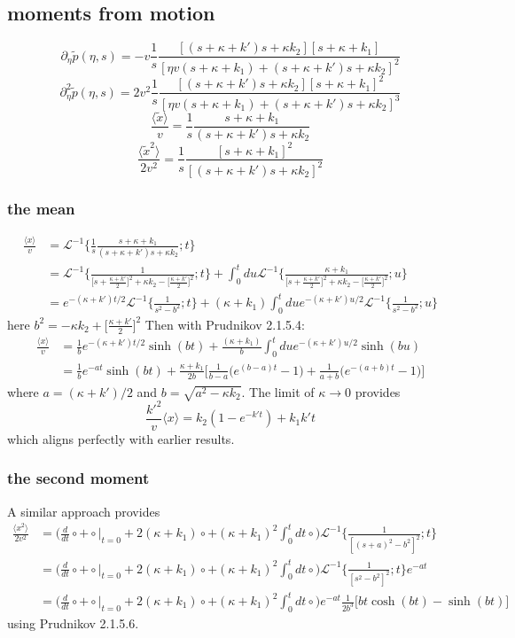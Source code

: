 \documentclass[11pt]{article}
\newcommand\be{\begin{equation}} %
\newcommand\ee{\end{equation}}   %
\newcommand\bra{\langle}
\newcommand\ket{\rangle}
\newcommand\tp{\tilde{p}}
\newcommand\El{\mathcal{L}}
\begin{document}
\subsection{moments from motion}
\be \partial_\eta \tp(\eta,s) = -v \frac{1}{s}\frac{[(s+\kappa + k')s + \kappa k_2][s+\kappa + k_1]}{[\eta v(s+\kappa +k_1) + (s+ \kappa + k')s+\kappa k_2]^2}\ee
\be \partial_\eta^2 \tp(\eta,s) = 2v^2 \frac{1}{s} \frac{[(s+\kappa + k')s+\kappa k_2][s+\kappa + k_1]^2}{[\eta v(s+\kappa + k_1) + (s+\kappa + k')s+ \kappa k_2]^3}\ee
\be  \frac{\bra\tilde{x}\ket} {v} = \frac{1}{s}\frac{s+\kappa + k_1}{(s+\kappa + k')s + \kappa k_2}\ee
\be \frac{\bra \tilde{x}^2 \ket}{2v^2} = \frac{1}{s} \frac{[s+\kappa + k_1]^2}{[(s+\kappa + k')s + \kappa k_2]^2} \ee
\subsubsection{the mean}
\begin{align}
\frac{\bra x \ket}{v} &= \El^{-1}\Big\{\frac{1}{s}\frac{s+\kappa + k_1}{(s+\kappa + k')s + \kappa k_2};t\Big\} \\
&= \El^{-1}\Big\{\frac{1}{\big[s+\frac{\kappa+k'}{2}\big]^2+\kappa k_2 - \big[\frac{\kappa+k'}{2}\big]^2};t\Big\} + 
\int_0^t du \El^{-1}\Big\{\frac{\kappa + k_1}{\big[s+\frac{\kappa+k'}{2}\big]^2+\kappa k_2 - \big[\frac{\kappa+k'}{2}\big]^2};u\Big\}\\
&= e^{-(\kappa + k')t/2}\El^{-1}\Big\{\frac{1}{s^2 - b^2};t\Big\} + (\kappa + k_1)\int_0^t du e^{-(\kappa + k')u/2}\El^{-1}\Big\{\frac{1}{s^2 - b^2};u\Big\}
\end{align}
here $b^2 = -\kappa k_2 + \big[\frac{\kappa+k'}{2}\big]^2$
Then with Prudnikov 2.1.5.4:
\begin{align}
\frac{\bra x \ket}{v} &= \frac{1}{b}e^{-(\kappa + k')t/2}\sinh(bt) + \frac{(\kappa +k_1)}{b}\int_0^t due^{-(\kappa + k')u/2}\sinh(bu)\\
&=  \frac{1}{b}e^{-at}\sinh(bt) + \frac{\kappa + k_1}{2b}\Big[\frac{1}{b-a}\Big(e^{(b-a)t}-1\Big)+ \frac{1}{a+b}\Big(e^{-(a+b)t}-1\Big)\Big]
\end{align}
where $a=(\kappa + k')/2$ and $b = \sqrt{a^2 -\kappa k_2}$.
The limit of $\kappa \rightarrow 0$ provides
\be \frac{k'^2}{v}\bra x \ket=k_2(1-e^{-k't})+ k_1k't \ee
which aligns perfectly with earlier results.


\subsubsection{the second moment}
A similar approach provides 
\begin{align}
 \frac{\bra x^2 \ket}{2v^2} &= \Big(\frac{d}{dt}\circ + \circ \Big|_{t=0} + 2(\kappa + k_1)\circ + (\kappa+k_1)^2\int_0^t dt \circ \Big)\El^{-1}\Big\{\frac{1}{[(s+a)^2-b^2]^2};t\Big\}\\
&= \Big(\frac{d}{dt}\circ + \circ \Big|_{t=0} + 2(\kappa + k_1)\circ + (\kappa+k_1)^2\int_0^t dt \circ \Big)\El^{-1}\Big\{\frac{1}{[s^2-b^2]^2};t\Big\}e^{-at}\\
&= \Big(\frac{d}{dt}\circ + \circ \Big|_{t=0} + 2(\kappa + k_1)\circ + (\kappa+k_1)^2\int_0^t dt \circ \Big)e^{-at}\frac{1}{2b^3}\Big[bt\cosh(bt)-\sinh(bt)\Big]
\end{align}
using Prudnikov 2.1.5.6.


\end{document}
